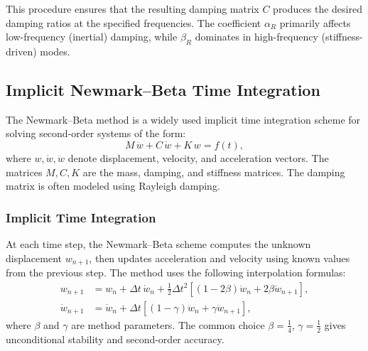 \documentclass{article}
\begin{document}
	This procedure ensures that the resulting damping matrix \( {C} \) produces the desired damping ratios at the specified frequencies. The coefficient \( \alpha_R \) primarily affects low-frequency (inertial) damping, while \( \beta_R \) dominates in high-frequency (stiffness-driven) modes.
		

	
	\subsection{Implicit Newmark–Beta Time Integration}

	The Newmark--Beta method is a widely used implicit time integration scheme for solving second-order systems of the form:
	\begin{equation}
		{M}\, \ddot{{w}} + {C}\, \dot{{w}} + {K}\, {w} = {f}(t),
	\end{equation}
	where \( \mathit{{w}}, \dot{\mathit{{w}}}, \ddot{\mathit{{w}}} \) denote displacement, velocity, and acceleration vectors. The matrices \( \mathit{{M}}, \mathit{{C}}, \mathit{{K}} \) are the mass, damping, and stiffness matrices. The damping matrix is often modeled using Rayleigh damping.
	
	
	
	
\subsubsection{Implicit Time Integration}
	At each time step, the Newmark--Beta scheme computes the unknown displacement \( \mathit{{w}}_{n+1} \), then updates acceleration and velocity using known values from the previous step. The method uses the following interpolation formulas:
	\begin{align}
		\mathit{{w}}_{n+1} &= \mathit{{w}}_n + \Delta t\, \dot{\mathit{{w}}}_n + \frac{1}{2} \Delta t^2 \left[ (1 - 2\beta) \ddot{\mathit{{w}}}_n + 2\beta \ddot{\mathit{{w}}}_{n+1} \right], \\
		\dot{\mathit{{w}}}_{n+1} &= \dot{\mathit{{w}}}_n + \Delta t \left[ (1 - \gamma) \ddot{\mathit{{w}}}_n + \gamma \ddot{\mathit{{w}}}_{n+1} \right],
	\end{align}
	where \( \beta \) and \( \gamma \) are method parameters. The common choice \( \beta = \tfrac{1}{4} \), \( \gamma = \tfrac{1}{2} \) gives unconditional stability and second-order accuracy.
	
\end{document}
